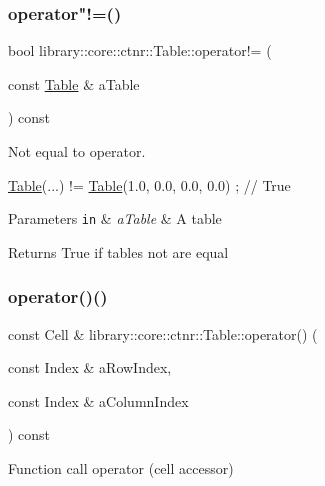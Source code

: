 \subsubsection{\texorpdfstring{operator"!=()}{operator!=()}}
{\footnotesize\ttfamily bool library\+::core\+::ctnr\+::\+Table\+::operator!= (\begin{DoxyParamCaption}\item[{const \hyperlink{classlibrary_1_1core_1_1ctnr_1_1_table}{Table} \&}]{a\+Table }\end{DoxyParamCaption}) const}



Not equal to operator. 


\begin{DoxyCode}
\hyperlink{classlibrary_1_1core_1_1ctnr_1_1_table_a5b11121caa4288c3da642af7c6a5a632}{Table}(...) != \hyperlink{classlibrary_1_1core_1_1ctnr_1_1_table_a5b11121caa4288c3da642af7c6a5a632}{Table}(1.0, 0.0, 0.0, 0.0) ; \textcolor{comment}{// True}
\end{DoxyCode}



\begin{DoxyParams}[1]{Parameters}
\mbox{\tt in}  & {\em a\+Table} & A table \\
\hline
\end{DoxyParams}
\begin{DoxyReturn}{Returns}
True if tables not are equal 
\end{DoxyReturn}
\mbox{\label{classlibrary_1_1core_1_1ctnr_1_1_table_a4eb003dcbe4c1c127adf473465e70bef}} 
\subsubsection{\texorpdfstring{operator()()}{operator()()}}
{\footnotesize\ttfamily const Cell \& library\+::core\+::ctnr\+::\+Table\+::operator() (\begin{DoxyParamCaption}\item[{const Index \&}]{a\+Row\+Index,  }\item[{const Index \&}]{a\+Column\+Index }\end{DoxyParamCaption}) const}



Function call operator (cell accessor) 



